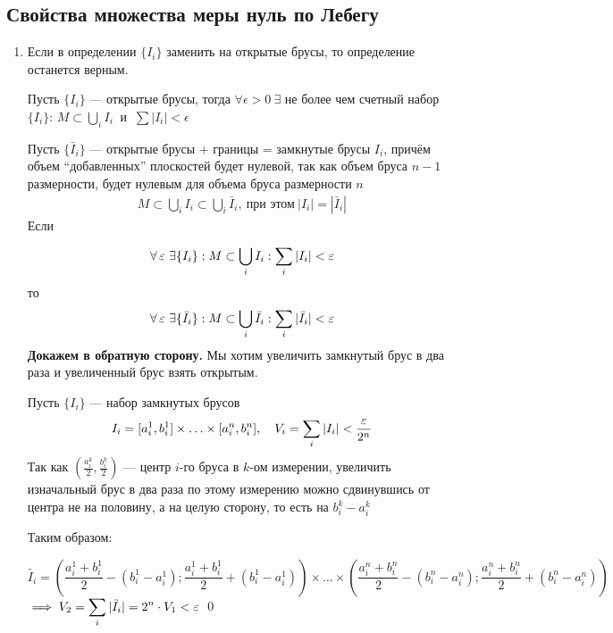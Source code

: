 \subsection{Свойства множества меры нуль по Лебегу}
\begin{enumerate}
    \item Если в определении $\{I_i\}$ заменить на открытые брусы, то определение останется верным.

    \proof Пусть $\{I_i\}$ — открытые брусы, тогда $\forall \epsilon > 0 \ \exists$ не более чем счетный набор $\{I_i\}$:
    $M\subset \displaystyle\bigcup_iI_i \ $ и $ \ \sum |I_i| < \epsilon$
    
    Пусть $\{\bar I_i\}$ — открытые брусы + границы = замкнутые брусы $I_i$, причём объем ``добавленных'' плоскостей будет нулевой, так как объем бруса $n-1$ размерности, будет нулевым для объема бруса размерности $n$
    \begin{equation*}
        \begin{aligned}
            M\subset\bigcup_iI_i \subset\bigcup_i\bar I_i, \ \text{при этом} \ |I_i| = |\bar I_i|
        \end{aligned}
    \end{equation*}
    Если


    \begin{equation*}
        \forall\ve\, \exists\{I_i\}: M \subset \bigcup_iI_i: \sum_i|I_i|<\ve
    \end{equation*}
    то
    \begin{equation*}
        \forall\ve\, \exists\{\bar I_i\}: M \subset \bigcup_i\bar I_i: \sum_i|\bar I_i|<\ve
    \end{equation*}
    \textbf{Докажем в обратную сторону.} Мы хотим увеличить замкнутый брус в два раза и увеличенный брус взять открытым.
    
    Пусть $\{I_i\}$ — набор замкнутых брусов
    \begin{equation*}
        I_i = [a^1_i, b^1_i]\times\ldots\times[a^n_i, b^n_i], \quad V_i = \sum_i|I_i|<\frac{\ve}{2^n}
    \end{equation*}
    Так как $\left(\frac{a_i^k}{2}, \frac{b_i^k}{2}\right)$ --- центр $i$-го бруса в $k$-ом измерении, увеличить изначальный брус в два раза по этому измерению можно сдвинувшись от центра не на половину, а на целую сторону, то есть на $b_i^k - a_i^k$

    Таким образом: 

    \begin{equation*}
        \tilde{I_i} = \left(\frac{a_i^1+b_i^1}{2} - (b_i^1-a_i^1) ; \frac{a_i^1 + b_i^1}{2} + (b_i^1 - a_i^1)\right) \times \ldots\times \left(\frac{a_i^n+b_i^n}{2} - (b_i^n-a_i^n) ; \frac{a_i^n + b_i^n}{2} + (b_i^n - a_i^n)\right)
    \end{equation*}
    $\implies V_2 = \displaystyle\sum_i|\tilde{I_i} | = 2^n \cdot V_1 < \ve$
    \qed


\end{enumerate}
